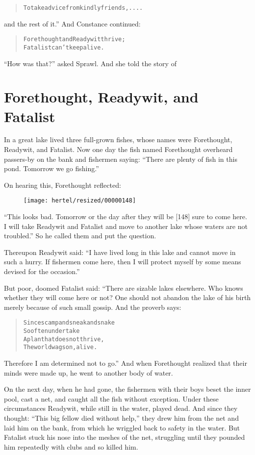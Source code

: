 \documentclass[article, twoside, 10pt]{memoir}
\renewenvironment{verbatim}{%
\begin{quote}%
\vskip -10pt%
\begin{alltt}\normalfont\small}{\end{alltt}%
\end{quote}%
\vskip -10pt
} %
\begin{document}
\begin{verbatim}
To take advice from kindly friends, ....
\end{verbatim}
and the rest of it.” And Constance continued:

\begin{verbatim}
Forethought and Ready wit thrive;
Fatalist can't keep alive.
\end{verbatim}
``How was that?'' asked Sprawl. And she told the story of

\chapter{Forethought, Readywit, and Fatalist}

In a great lake lived three full-grown fishes, whose names were
Forethought, Readywit, and Fatalist. Now one day the fish named
Forethought overheard passers-by on the bank and fishermen saying:
``There are plenty of fish in this pond. Tomorrow we go fishing.''

On hearing this, Forethought reflected:
\begin{figure}[p]\texttt{[image: hertel/resized/00000148]}\end{figure}``This looks bad. Tomorrow or the day after they will be [148] sure to come here. I will take Readywit and Fatalist and move to another lake whose waters are not troubled.''
So he called them and put the question.

Thereupon Readywit said:
``I have lived long in this lake and cannot move in such a hurry. If fishermen come here, then I will protect myself by some means devised for the occasion.''

But poor, doomed Fatalist said: “There are sizable lakes elsewhere.
Who knows whether they will come here or not? One should not
abandon the lake of his birth merely because of such small gossip.
And the proverb says:

\begin{verbatim}
Since scamp and sneak and snake
So often undertake
A plan that does not thrive,
The world wags on, alive.
\end{verbatim}
Therefore I am determined not to go.” And when Forethought realized
that their minds were made up, he went to another body of water.

On the next day, when he had gone, the fishermen with their boys
beset the inner pool, cast a net, and caught all the fish without
exception. Under these circumstances Readywit, while still in the
water, played dead. And since they thought:
``This big fellow died without help,'' they drew him from the net
and laid him on the bank, from which he wriggled back to safety in
the water. But Fatalist stuck his nose into the meshes of the net,
struggling until they pounded him repeatedly with clubs and so
killed him.
\end{document}
